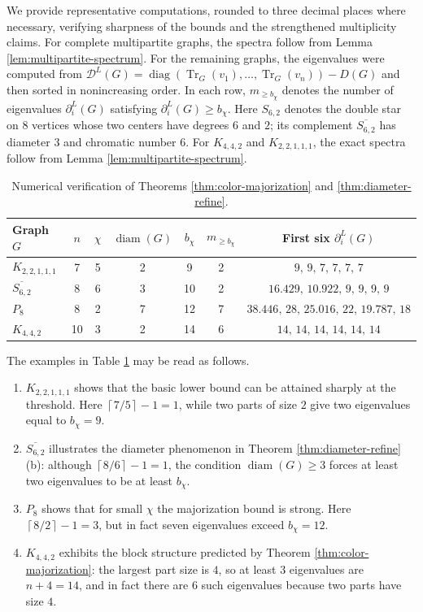 \documentclass[12pt]{article}
\newcommand{\DL}{\mathcal{D}^{L}}
\newcommand{\comp}[1]{\overline{#1}}
\newcommand{\ceil}[1]{\left\lceil #1 \right\rceil}
\newcommand{\Tr}{\operatorname{Tr}}
\newcommand{\diam}{\operatorname{diam}}
\theoremstyle{plain}
\theoremstyle{definition}
\begin{document}
\noindent  We provide representative computations, rounded to three decimal places where necessary, verifying sharpness of the bounds and
the strengthened multiplicity claims. For complete multipartite graphs, the spectra follow from Lemma
\ref{lem:multipartite-spectrum}. For the remaining graphs, the eigenvalues were computed from
$\DL(G)=\operatorname{diag}(\Tr_G(v_1),\dots,\Tr_G(v_n))-D(G)$ and then sorted in nonincreasing order. In each row,
$m_{\ge b_\chi}$ denotes the number of eigenvalues $\partial_i^L(G)$ satisfying $\partial_i^L(G)\ge b_\chi$. Here
$S_{6,2}$ denotes the double star on $8$ vertices whose two centers have degrees $6$ and $2$; its complement
$\comp{S_{6,2}}$ has diameter $3$ and chromatic number $6$. For $K_{4,4,2}$ and $K_{2,2,1,1,1}$, the exact spectra follow
from Lemma \ref{lem:multipartite-spectrum}.

\begin{table}[H]
    \centering
    \small
    \begin{tabular}{@{}lcccccc@{}}
        \toprule
        Graph $G$ & $n$ & $\chi$ & $\diam(G)$ & $b_\chi$ & $m_{\ge b_\chi}$ & First six $\partial_i^L(G)$ \\
        \midrule
        $K_{2,2,1,1,1}$ & 7 & 5 & 2 & 9 & 2 &
        $9,\,9,\,7,\,7,\,7,\,7$ \\
        $\comp{S_{6,2}}$ & 8 & 6 & 3 & 10 & 2 &
        $16.429,\,10.922,\,9,\,9,\,9,\,9$ \\
        $P_8$ & 8 & 2 & 7 & 12 & 7 &
        $38.446,\,28,\,25.016,\,22,\,19.787,\,18$ \\
        $K_{4,4,2}$ & 10 & 3 & 2 & 14 & 6 &
        $14,\,14,\,14,\,14,\,14,\,14$ \\
        \bottomrule
    \end{tabular}
    \caption{Numerical verification of Theorems \ref{thm:color-majorization} and \ref{thm:diameter-refine}.}
    \label{table 1}
\end{table}

\noindent  The examples in Table \ref{table 1} may be read as follows.
\begin{enumerate}[noitemsep]
    \item $K_{2,2,1,1,1}$ shows that the basic lower bound can be attained sharply at the threshold. Here
    $\ceil{7/5}-1=1$, while two parts of size $2$ give two eigenvalues equal to $b_\chi=9$.
    \item $\comp{S_{6,2}}$ illustrates the diameter phenomenon in Theorem \ref{thm:diameter-refine}(b): although
    $\ceil{8/6}-1=1$, the condition $\diam(G)\ge3$ forces at least two eigenvalues to be at least $b_\chi$.
    \item $P_8$ shows that for small $\chi$ the majorization bound is strong. Here $\ceil{8/2}-1=3$, but in fact seven
    eigenvalues exceed $b_\chi=12$.
    \item $K_{4,4,2}$ exhibits the block structure predicted by Theorem \ref{thm:color-majorization}: the largest part size is
    $4$, so at least $3$ eigenvalues are $n+4=14$, and in fact there are $6$ such eigenvalues because two parts have size $4$.
\end{enumerate}
\end{document}
